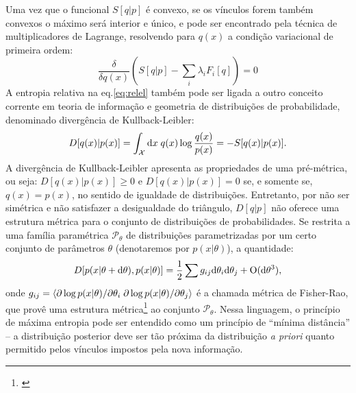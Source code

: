 Uma vez que o funcional $S[q | p]$ é convexo, se os vínculos forem também convexos o máximo será interior e único, e pode ser encontrado pela técnica de multiplicadores de Lagrange, resolvendo para $q(x)$ a condição variacional de primeira ordem:
\begin{equation}
\label{eq:entropymaximization}
\frac{\delta }{\delta q(x)}\left( S[q|p] - \sum_{i} \lambda_i F_i[q]\right) = 0
\end{equation}
A entropia relativa na eq.\eqref{eq:relel} também pode ser ligada a outro conceito corrente em teoria de informação e geometria de distribuições de probabilidade, denominado divergência de Kullback-Leibler\cite{Amari2000}:
\begin{equation}
\label{eq:kldiv}
 D[q(x) | p(x)] = \int_{\mathcal{X}} \ud x\; q(x) \log\frac{q(x)}{p(x)} = - S[q(x) | p(x)].
\end{equation}
A divergência de Kullback-Leibler apresenta as propriedades de uma pré-métrica, ou seja:  $D[q(x) | p(x)]\ge 0$ e $ D[q(x) | p(x)] = 0$ se, e somente se, $q(x) = p(x)$, no sentido de igualdade de distribuições. Entretanto, por não ser simétrica e não satisfazer a desigualdade do triângulo, $D[q|p]$ não oferece uma estrutura métrica para o conjunto de distribuições de probabilidades. Se restrita a uma família paramétrica  $\mathcal{P}_\theta$ de distribuições parametrizadas por um certo conjunto de parâmetros $\theta$ (denotaremos por $p(x|\theta)$), a quantidade:
\begin{equation}
 D[p(x|\theta+\mathrm{d}\theta), p(x|\theta)] = \frac{1}{2}\sum g_{ij} \mathrm{d}\theta_i \mathrm{d}\theta_j + \mathrm{O}(\mathrm{d}\theta^3),
\end{equation}
onde $g_{ij} = \left\langle \partial \log p(x|\theta)/ \partial \theta_i\;{\partial \log p(x|\theta) / \partial \theta_j} \right\rangle$ é a chamada métrica de Fisher-Rao, que provê uma estrutura métrica\footnote{\citet{Amari2000}} ao conjunto $\mathcal{P}_\theta$. Nessa linguagem, o princípio de máxima entropia pode ser entendido como um princípio de ``mínima distância'' -- a distribuição posterior deve ser tão próxima da distribuição \emph{a priori} quanto permitido pelos vínculos impostos pela nova informação.
